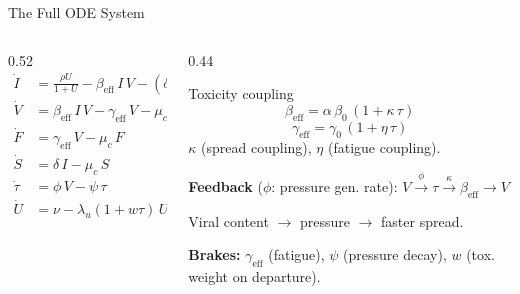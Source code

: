 \documentclass[aspectratio=169,11pt]{beamer}
\begin{document}
\begin{frame}{The Full ODE System}
  \begin{columns}[T]
    \begin{column}{0.52\textwidth}
      \small
      \begin{align*}
        \dot I &= \tfrac{\rho U}{1+U}
                 - \beta_{\mathrm{eff}}\,I\,V
                 - (\delta+\mu_c)\,I \\[2pt]
        \dot V &= \beta_{\mathrm{eff}}\,I\,V
                 - \gamma_{\mathrm{eff}}\,V
                 - \mu_c\,V \\[2pt]
        \dot F &= \gamma_{\mathrm{eff}}\,V - \mu_c\,F \\[2pt]
        \dot S &= \delta\,I - \mu_c\,S \\[4pt]
        \dot\tau &= \phi\,V - \psi\,\tau \\[2pt]
        \dot U &= \nu - \lambda_u(1+w\tau)\,U
      \end{align*}
    \end{column}
    \begin{column}{0.44\textwidth}
      \begin{alertblock}{Toxicity coupling}
        \small
        \[
          \beta_{\mathrm{eff}} = \alpha\,\beta_0\,(1+\kappa\,\tau)
        \]
        \[
          \gamma_{\mathrm{eff}} = \gamma_0\,(1+\eta\,\tau)
        \]
        \vspace{-0.3em}
        $\kappa$ (spread coupling), $\eta$ (fatigue coupling).
      \end{alertblock}

      \vspace{0.15em}
      \small\textbf{Feedback} ($\phi$: pressure gen. rate):
      $V \xrightarrow{\phi} \tau \xrightarrow{\kappa} \beta_{\mathrm{eff}} \to V$

      \vspace{0.1em}
      Viral content $\to$ pressure $\to$ faster spread.

      \vspace{0.15em}
      \textbf{Brakes:} $\gamma_{\mathrm{eff}}$ (fatigue),
      $\psi$ (pressure decay), $w$ (tox. weight on departure).
    \end{column}
  \end{columns}
\end{frame}
\end{document}

